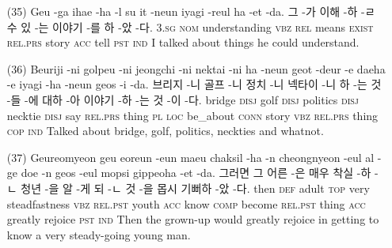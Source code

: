 \begin{itemize}
\item [(35)]
\tgl
		{Geu -ga ihae -ha -l su it -neun iyagi -reul ha -et -da.}
		{그 -가 이해 -하 -ㄹ 수 있 -는 이야기 -를 하 -았 -다.}
		{\textsc{3.sg}	\textsc{nom}	understanding	\textsc{vbz}	\textsc{rel}	means	\textsc{exist}	\textsc{rel.prs}	story	\textsc{acc}	tell	\textsc{pst}	\textsc{ind}}
		{I talked about things he could understand.}

\item [(36)]
\tgl
		{Beuriji -ni golpeu -ni jeongchi -ni nektai -ni ha -neun geot -deur -e daeha -e iyagi -ha -neun geos -i -da.}
		{브리지 -니 골프 -니 정치 -니 넥타이 -니 하 -는 것 -들 -에 대하 -아 이야기 -하 -는 것 -이 -다.}
		{bridge	\textsc{disj}	golf	\textsc{disj}	politics	\textsc{disj}	necktie	\textsc{disj}	say	\textsc{rel.prs}	thing	\textsc{pl}	\textsc{loc}	be\_about	\textsc{conn}	story	\textsc{vbz}	\textsc{rel.prs}	thing	\textsc{cop}	\textsc{ind}}
		{Talked about bridge, golf, politics, neckties and whatnot.}

\item [(37)]
\tgl
		{Geureomyeon geu eoreun -eun maeu chaksil -ha -n cheongnyeon -eul al -ge doe -n geos -eul mopsi gippeoha -et -da.}
		{그러면 그 어른 -은 매우 착실 -하 -ㄴ 청년 -을 알 -게 되 -ㄴ 것 -을 몹시 기뻐하 -았 -다.}
		{then	\textsc{def}	adult	\textsc{top}	very	steadfastness	\textsc{vbz}	\textsc{rel.pst}	youth	\textsc{acc}	know	\textsc{comp}	become	\textsc{rel.pst}	thing	\textsc{acc}	greatly	rejoice	\textsc{pst}	\textsc{ind}}
		{Then the grown-up would greatly rejoice in getting to know a very steady-going young man.}

\pagebreak
\end{itemize}